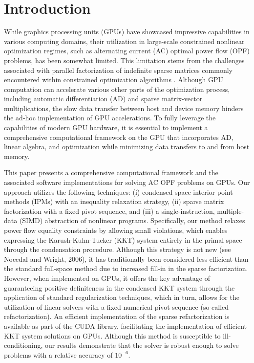 \section{Introduction}
While graphics processing units (GPUs) have showcased impressive
capabilities in various computing domains, their utilization in
large-scale constrained nonlinear optimization regimes, such as
alternating current (AC) optimal power flow (OPF) problems, has been
somewhat limited. This limitation stems from the challenges associated
with parallel factorization of indefinite sparse matrices commonly
encountered within constrained optimization algorithms
\cite{anitescu2021targeting}. Although GPU computation can accelerate
various other parts of the optimization process, including automatic
differentiation (AD) and sparse matrix-vector multiplications, the
slow data transfer between host and device memory hinders the ad-hoc
implementation of GPU accelerations. To fully leverage the
capabilities of modern GPU hardware, it is essential to implement a
comprehensive computational framework on the GPU that incorporates AD,
linear algebra, and optimization while minimizing data transfers to
and from host memory.

This paper presents a comprehensive computational framework and the
associated software implementations for solving AC OPF problems on
GPUs. Our approach utilizes the following techniques: (i)
condensed-space interior-point methods (IPMs) with an inequality
relaxation strategy, (ii) sparse matrix factorization with a fixed
pivot sequence, and (iii) a single-instruction, multiple-data (SIMD)
abstraction of nonlinear programs. Specifically, our method relaxes
power flow equality constraints by allowing small violations, which
enables expressing the Karush-Kuhn-Tucker (KKT) system entirely in the
primal space through the condensation procedure. Although this
strategy is not new (see Nocedal and Wright, 2006), it has
traditionally been considered less efficient than the standard
full-space method due to increased fill-in in the sparse
factorization. However, when implemented on GPUs, it offers the key
advantage of guaranteeing positive definiteness in the condensed KKT
system through the application of standard regularization techniques,
which in turn, allows for the utilization of linear solvers with a
fixed numerical pivot sequence (so-called refactorization). An
efficient implementation of the sparse refactorization is available as
part of the CUDA library, facilitating the implementation of efficient
KKT system solutions on GPUs. Although this method is susceptible to
ill-conditioning, our results demonstrate that the solver is robust
enough to solve problems with a relative accuracy of $10^{-6}$.

